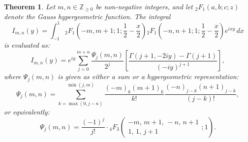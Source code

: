 \documentclass[12pt]{article}
\newtheorem{theorem}{Theorem}
\begin{document}
\begin{theorem}\label{thm:EvaluationOfIntegral}
Let $m, n \in \mathbb{Z}_{\geq 0}$ be non-negative integers, and let ${}_2F_1(a, b; c; z)$ denote the Gauss hypergeometric function. The integral
\[
I_{m,n}(y) = \int_{-1}^1 {}_2F_1\left(-m, m+1; 1; \frac{1}{2} - \frac{x}{2}\right) 
{}_2F_1\left(-n, n+1; 1; \frac{1}{2} - \frac{x}{2}\right) e^{i x y} \, dx
\]
is evaluated as:
\[
I_{m,n}(y) = e^{iy} \sum_{j=0}^{m+n} \frac{\Psi_j(m,n)}{2^j} 
\left[\frac{\Gamma(j+1, -2iy) - \Gamma(j+1)}{(-iy)^{j+1}}\right],
\]
where $\Psi_j(m, n)$ is given as either a sum or a hypergeometric representation:
\[
\Psi_j(m,n) = \sum_{k=\max(0, j-n)}^{\min(j, m)} 
\frac{(-m)_k (m+1)_k}{k!} 
\frac{(-n)_{j-k} (n+1)_{j-k}}{(j-k)!},
\]
or equivalently:
\[
\Psi_j(m,n) = \frac{(-1)^j}{j!} \cdot {}_4F_3\left(
\begin{matrix}
- m, \, m+1, \, -n, \, n+1 \\
1, \, 1, \, j+1
\end{matrix}; 1 \right).
\]
\end{theorem}
\end{document}
